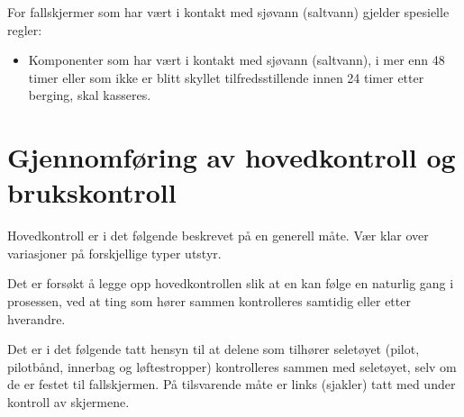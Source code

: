 For fallskjermer som har vært i kontakt med sjøvann (saltvann) gjelder spesielle regler:
\begin{itemize}
	\item Komponenter som har vært i kontakt med sjøvann (saltvann), i mer enn 48 timer eller som ikke er blitt skyllet tilfredsstillende innen 24 timer etter berging, skal kasseres.
\end{itemize}

\section{Gjennomføring av hovedkontroll og brukskontroll}
Hovedkontroll er i det følgende beskrevet på en generell måte. Vær klar over variasjoner på forskjellige typer utstyr.

Det er forsøkt å legge opp hovedkontrollen slik at en kan følge en naturlig gang i prosessen, ved at ting som hører sammen kontrolleres samtidig eller etter hverandre.

Det er i det følgende tatt hensyn til at delene som tilhører seletøyet (pilot, pilotbånd, innerbag og løftestropper) kontrolleres sammen med seletøyet, selv om de er festet til fallskjermen. På tilsvarende måte er links (sjakler) tatt med under kontroll av skjermene.

